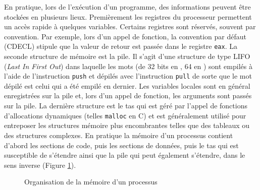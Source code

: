 En pratique, lors de l'exécution d'un programme, des informations peuvent être stockées en plusieurs lieux. 
Premièrement les registres du processeur permettent un accès rapide à quelques variables.
Certains registres sont réservés, souvent par convention. Par exemple, lors d'un appel de fonction, la convention par défaut (CDECL) stipule que la valeur de retour est passée dans le registre \texttt{eax}.
La seconde structure de mémoire est la pile. 
Il s'agit d'une structure de type LIFO (\emph{Last In First Out}) dans laquelle les mots (de 32 bits en \xq, 64 en \xs) sont empilés à l'aide de l'instruction \texttt{push} et dépilés avec l'instruction \texttt{pull} de sorte que le mot dépilé est celui qui a été empilé en dernier.
Les variables locales sont en général enregistrées sur la pile et, lors d'un appel de fonction, les arguments sont passés sur la pile.
La dernière structure est le tas qui est géré par l'appel de fonctions d'allocations dynamiques (telles \texttt{malloc} en C) et est généralement utilisé pour entreposer les structures mémoire plus encombrantes telles que des tableaux ou des structures complexes.
En pratique la mémoire d'un processus contient d'abord les sections de code, puis les sections de données, puis le tas qui est susceptible de s'étendre ainsi que la pile qui peut également s'étendre, dans le sens inverse (Figure \ref{fig:mem_process}).

\begin{figure}[h]
\begin{center}
\end{center}
\caption{Organisation de la mémoire d'un processus}
\label{fig:mem_process}
\end{figure}



